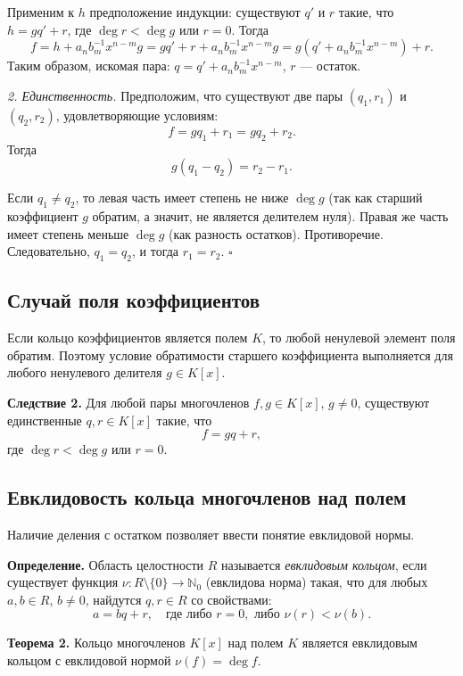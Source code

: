 \documentclass[a4paper,12pt]{article}
\theoremstyle{definition}
\theoremstyle{plain}
\theoremstyle{remark}
\begin{document}
	Применим к \( h \) предположение индукции: существуют \( q' \) и \( r \) такие, что \( h = g q' + r \), где \( \deg r < \deg g \) или \( r = 0 \). Тогда
	\[
	f = h + a_n b_m^{-1} x^{n-m} g = g q' + r + a_n b_m^{-1} x^{n-m} g = g (q' + a_n b_m^{-1} x^{n-m}) + r.
	\]
	Таким образом, искомая пара: \( q = q' + a_n b_m^{-1} x^{n-m} \), \( r \) — остаток.
	
	\textit{2. Единственность.} Предположим, что существуют две пары \( (q_1, r_1) \) и \( (q_2, r_2) \), удовлетворяющие условиям:
	\[
	f = g q_1 + r_1 = g q_2 + r_2.
	\]
	Тогда
	\[
	g (q_1 - q_2) = r_2 - r_1.
	\]
	
	Если \( q_1 \neq q_2 \), то левая часть имеет степень не ниже \( \deg g \) (так как старший коэффициент \( g \) обратим, а значит, не является делителем нуля). Правая же часть имеет степень меньше \( \deg g \) (как разность остатков). Противоречие. Следовательно, \( q_1 = q_2 \), и тогда \( r_1 = r_2 \). \hfill \(\square\)
	
	\subsection{Случай поля коэффициентов}
	
	Если кольцо коэффициентов является полем \( K \), то любой ненулевой элемент поля обратим. Поэтому условие обратимости старшего коэффициента выполняется для любого ненулевого делителя \( g \in K[x] \).
	
	\medskip
	\noindent \textbf{Следствие 2.} Для любой пары многочленов \( f, g \in K[x] \), \( g \neq 0 \), существуют единственные \( q, r \in K[x] \) такие, что
	\[
	f = gq + r,
	\]
	где \( \deg r < \deg g \) или \( r = 0 \).
	
	\subsection{Евклидовость кольца многочленов над полем}
	
	Наличие деления с остатком позволяет ввести понятие евклидовой нормы.
	
	\medskip
	\noindent \textbf{Определение.} Область целостности \( R \) называется \textit{евклидовым кольцом}, если существует функция \( \nu: R \setminus \{0\} \to \mathbb{N}_0 \) (евклидова норма) такая, что для любых \( a, b \in R \), \( b \neq 0 \), найдутся \( q, r \in R \) со свойствами:
	\[
	a = bq + r, \quad \text{где либо } r = 0, \text{ либо } \nu(r) < \nu(b).
	\]
	
	\medskip
	\noindent \textbf{Теорема 2.} Кольцо многочленов \( K[x] \) над полем \( K \) является евклидовым кольцом с евклидовой нормой \( \nu(f) = \deg f \).
	
\end{document}
